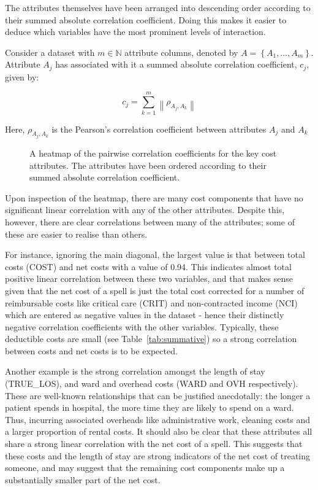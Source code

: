 The attributes themselves have been arranged into descending order according to
their summed absolute correlation coefficient. Doing this makes it easier to
deduce which variables have the most prominent levels of interaction.

\begin{definition}
    Consider a dataset with \(m \in \mathbb{N}\) attribute columns, denoted
    by \(A = \left\{A_1, \ldots, A_m\right\}\). Attribute \(A_j\) has
    associated with it a summed absolute correlation coefficient, \(c_j\), given
    by:
    
    \[
        c_j = \sum_{k=1}^{m} \left\| \rho_{A_j, A_k} \right\|
    \]

    Here, \(\rho_{A_j, A_k}\) is the Pearson's correlation coefficient
    between attributes \(A_j\) and \(A_k\)
\end{definition}\label{def:absolute_correlation}

\begin{figure}[htbp]
    \caption{A heatmap of the pairwise correlation coefficients for the key cost
        attributes. The attributes have been ordered according to their summed
        absolute correlation coefficient.}%
    \label{fig:corr_heatmap}
\end{figure}

Upon inspection of the heatmap, there are many cost components that have no
significant linear correlation with any of the other attributes. Despite this,
however, there are clear correlations between many of the attributes; some of
these are easier to realise than others.

For instance, ignoring the main diagonal, the largest value is that between
total costs (COST) and net costs with a value of 0.94. This indicates almost
total positive linear correlation between these two variables, and that makes
sense given that the net cost of a spell is just the total cost corrected for a
number of reimbursable costs like critical care (CRIT) and non-contracted income
(NCI) which are entered as negative values in the dataset \-- hence their
distinctly negative correlation coefficients with the other variables.
Typically, these deductible costs are small (see Table~\ref{tab:summative}) so a
strong correlation between costs and net costs is to be expected.

Another example is the strong correlation amongst the length of stay
(TRUE\_LOS), and ward and overhead costs (WARD and OVH respectively). These are
well-known relationships that can be justified anecdotally: the longer a patient
spends in hospital, the more time they are likely to spend on a ward. Thus,
incurring associated overheads like administrative work, cleaning costs and a
larger proportion of rental costs. It should also be clear that these attributes
all share a strong linear correlation with the net cost of a spell. This
suggests that these costs and the length of stay are strong indicators of the
net cost of treating someone, and may suggest that the remaining cost components 
make up a substantially smaller part of the net cost.


